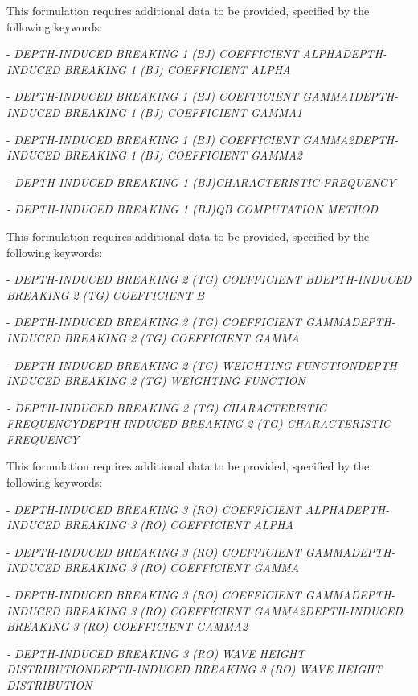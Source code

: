  This formulation requires additional data to be provided, specified by the following keywords:

 - \textit{DEPTH-INDUCED BREAKING 1 (BJ) COEFFICIENT ALPHADEPTH-INDUCED BREAKING 1 (BJ) COEFFICIENT ALPHA }

 - \textit{DEPTH-INDUCED BREAKING 1 (BJ) COEFFICIENT GAMMA1DEPTH-INDUCED BREAKING 1 (BJ) COEFFICIENT GAMMA1 }

 - \textit{DEPTH-INDUCED BREAKING 1 (BJ) COEFFICIENT GAMMA2DEPTH-INDUCED BREAKING 1 (BJ) COEFFICIENT GAMMA2 }

 \textit{- DEPTH-INDUCED BREAKING 1 (BJ)CHARACTERISTIC FREQUENCY }

 \textit{- DEPTH-INDUCED BREAKING 1 (BJ)QB COMPUTATION METHOD}

 \textit{}

 \textbf{}

 This formulation requires additional data to be provided, specified by the following keywords:

 - \textit{DEPTH-INDUCED BREAKING 2 (TG) COEFFICIENT BDEPTH-INDUCED BREAKING 2 (TG) COEFFICIENT B}

 - \textit{DEPTH-INDUCED BREAKING 2 (TG) COEFFICIENT GAMMADEPTH-INDUCED BREAKING 2 (TG) COEFFICIENT GAMMA }

 - \textit{DEPTH-INDUCED BREAKING 2 (TG) WEIGHTING FUNCTIONDEPTH-INDUCED BREAKING 2 (TG) WEIGHTING FUNCTION}

 \textit{- DEPTH-INDUCED BREAKING 2 (TG) CHARACTERISTIC FREQUENCYDEPTH-INDUCED BREAKING 2 (TG) CHARACTERISTIC FREQUENCY }

 \textbf{\underbar{}}

 \textbf{}

 This formulation requires additional data to be provided, specified by the following keywords:

 - \textit{DEPTH-INDUCED BREAKING 3 (RO) COEFFICIENT ALPHADEPTH-INDUCED BREAKING 3 (RO) COEFFICIENT ALPHA}

 - \textit{DEPTH-INDUCED BREAKING 3 (RO) COEFFICIENT GAMMADEPTH-INDUCED BREAKING 3 (RO) COEFFICIENT GAMMA}

 - \textit{DEPTH-INDUCED BREAKING 3 (RO) COEFFICIENT GAMMADEPTH-INDUCED BREAKING 3 (RO) COEFFICIENT GAMMA2DEPTH-INDUCED BREAKING 3 (RO) COEFFICIENT GAMMA2}

 \textit{- DEPTH-INDUCED BREAKING 3 (RO) WAVE HEIGHT DISTRIBUTIONDEPTH-INDUCED BREAKING 3 (RO) WAVE HEIGHT DISTRIBUTION}

